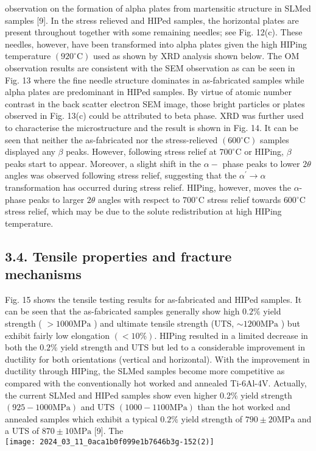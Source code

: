 \documentclass[10pt]{article}
\begin{document}
observation on the formation of alpha plates from martensitic structure in SLMed samples [9]. In the stress relieved and HIPed samples, the horizontal plates are present throughout together with some remaining needles; see Fig. 12(c). These needles, however, have been transformed into alpha plates given the high HIPing temperature $\left(920^{\circ} \mathrm{C}\right)$ used as shown by XRD analysis shown below. The OM observation results are consistent with the SEM observation as can be seen in Fig. 13 where the fine needle structure dominates in as-fabricated samples while alpha plates are predominant in HIPed samples. By virtue of atomic number contrast in the back scatter electron SEM image, those bright particles or plates observed in Fig. 13(c) could be attributed to beta phase. XRD was further used to characterise the microstructure and the result is shown in Fig. 14. It can be seen that neither the as-fabricated nor the stress-relieved $\left(600{ }^{\circ} \mathrm{C}\right)$ samples displayed any $\beta$ peaks. However, following stress relief at $700^{\circ} \mathrm{C}$ or HIPing, $\beta$ peaks start to appear. Moreover, a slight shift in the $\alpha-$ phase peaks to lower $2 \theta$ angles was observed following stress relief, suggesting that the $\alpha^{\prime} \rightarrow \alpha$ transformation has occurred during stress relief. HIPing, however, moves the $\alpha$-phase peaks to larger $2 \theta$ angles with respect to $700{ }^{\circ} \mathrm{C}$ stress relief towards $600{ }^{\circ} \mathrm{C}$ stress relief, which may be due to the solute redistribution at high HIPing temperature.

\subsection*{3.4. Tensile properties and fracture mechanisms}
Fig. 15 shows the tensile testing results for as-fabricated and HIPed samples. It can be seen that the as-fabricated samples generally show high $0.2 \%$ yield strength ( $>1000 \mathrm{MPa}$ ) and ultimate tensile strength (UTS, $\sim 1200 \mathrm{MPa}$ ) but exhibit fairly low elongation $(<10 \%)$. HIPing resulted in a limited decrease in both the $0.2 \%$ yield strength and UTS but led to a considerable improvement in ductility for both orientations (vertical and horizontal). With the improvement in ductility through HIPing, the SLMed samples become more competitive as compared with the conventionally hot worked and annealed Ti-6Al-4V. Actually, the current SLMed and HIPed samples show even higher 0.2\% yield strength $(925-1000 \mathrm{MPa})$ and UTS $(1000-1100 \mathrm{MPa})$ than the hot worked and annealed samples which exhibit a typical $0.2 \%$ yield strength of $790 \pm 20 \mathrm{MPa}$ and a UTS of $870 \pm 10 \mathrm{MPa}$ [9]. The\\
\texttt{[image: 2024\_03\_11\_0aca1b0f099e1b7646b3g-152(2)]}
\end{document}
